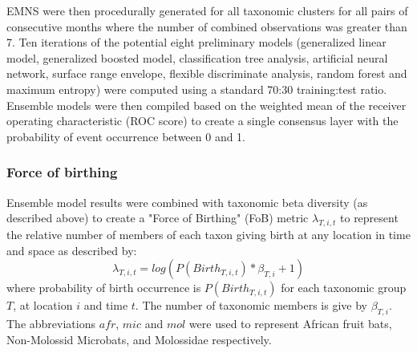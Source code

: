 \documentclass[9pt,twoside,lineno]{pnas-new}
\begin{document}
EMNS were then procedurally generated for all taxonomic clusters for all pairs of consecutive months where the number of combined observations was greater than 7. Ten iterations of the potential eight preliminary models (generalized linear model, generalized boosted model, classification tree analysis, artificial neural network, surface range envelope, flexible discriminate analysis, random forest and maximum entropy) were computed using a standard 70:30 training:test ratio. Ensemble models were then compiled based on the weighted mean of the receiver operating characteristic (ROC score) to create a single consensus layer with the probability of event occurrence between 0 and 1.\par
\subsubsection*{Force of birthing}
Ensemble model results were combined with taxonomic beta diversity (as described above) to create a "Force of Birthing" (FoB) metric $\lambda_{T,i,t}$ to represent the relative number of members of each taxon giving birth at any location in time and space as described by:
\[
  	    \lambda_{T,i,t} = log(P(Birth_{T,i,t})*\beta_{T,i} +1)
\]
where probability of birth occurrence is $P(Birth_{T,i,t})$ for each taxonomic group $T$, at location $i$ and time $t$. The number of taxonomic members is give by $\beta_{T,i}$. The abbreviations $afr$, $mic$ and $mol$ were used to represent African fruit bats, Non-Molossid Microbats, and Molossidae respectively. \par 
\end{document}
